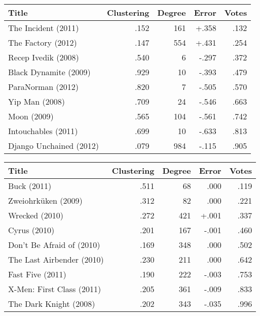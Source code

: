 \begin{table*}[!t]
\caption{\label{tab:errors_pred_votes}Errors in predictive results for votes.}

\begin{subtable}[b]{\textwidth}
\caption{\textbf{Predictor Misses}}
\centering
\begin{tabular}{lrrrr} \toprule
Title                   & Clustering & Degree & Error  & Votes \\ \midrule
The Incident (2011)     & .152       & 161    & +.358  & .132  \\
The Factory (2012)      & .147       & 554    & +.431  & .254  \\
Recep Ivedik (2008)     & .540       & 6      & -.297  & .372  \\
Black Dynamite (2009)   & .929       & 10     & -.393  & .479  \\
ParaNorman (2012)       & .820       & 7      & -.505  & .570  \\
Yip Man (2008)          & .709       & 24     & -.546  & .663  \\
Moon (2009)             & .565       & 104    & -.561  & .742  \\
Intouchables (2011)     & .699       & 10     & -.633  & .813  \\
Django Unchained (2012) & .079       & 984    & -.115  & .905  \\ \bottomrule
\end{tabular}
\end{subtable}

\vspace*{.5 cm}

\begin{subtable}[b]{\textwidth}
\caption{\textbf{Predictor Hits}}
\centering
\begin{tabular}{lrrrr} \toprule
Title                     & Clustering & Degree & Error & Votes  \\ \midrule
Buck (2011)               & .511       & 68     &  .000 & .119   \\
Zweiohrküken (2009)       & .312       & 82     &  .000 & .221   \\
Wrecked (2010)            & .272       & 421    & +.001 & .337   \\
Cyrus (2010)              & .201       & 167    & -.001 & .460   \\
Don't Be Afraid of (2010) & .169       & 348    &  .000 & .502   \\
The Last Airbender (2010) & .230       & 211    &  .000 & .642   \\
Fast Five (2011)          & .190       & 222    & -.003 & .753   \\
X-Men: First Class (2011) & .205       & 361    & -.009 & .833   \\
The Dark Knight (2008)    & .202       & 343    & -.035 & .996   \\ \bottomrule
\end{tabular}
\end{subtable}

\end{table*}
